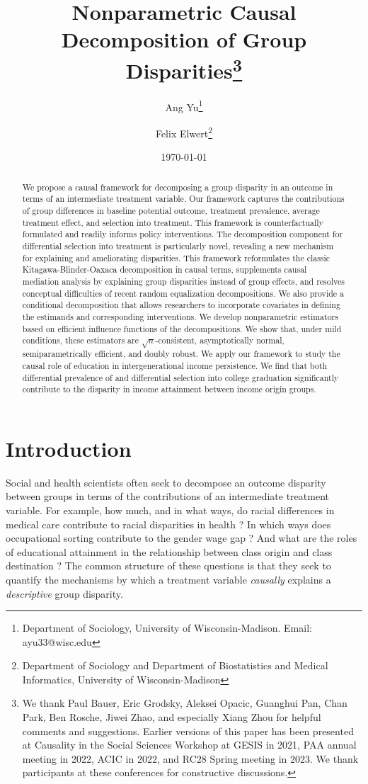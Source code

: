 \documentclass[12pt,a4paper]{article}
\title{\Large Nonparametric Causal Decomposition of Group Disparities\thanks{We thank Paul Bauer, Eric Grodsky, Aleksei Opacic, Guanghui Pan, Chan Park, Ben Rosche, Jiwei Zhao, and especially Xiang Zhou for helpful comments and suggestions. Earlier versions of this paper has been presented at Causality in the Social Sciences Workshop at GESIS in 2021, PAA annual meeting in 2022, ACIC in 2022, and RC28 Spring meeting in 2023. We thank participants at these conferences for constructive discussions.}}
\author{\large Ang Yu\thanks{Department of Sociology, University of Wisconsin-Madison. Email: ayu33@wisc.edu} \and Felix Elwert\thanks{Department of Sociology and Department of Biostatistics and Medical Informatics, University of Wisconsin-Madison}}
\date{\large \today}
\begin{document}
\maketitle

\begin{abstract}
We propose a causal framework for decomposing a group disparity in an outcome in terms of an intermediate treatment variable. Our framework captures the contributions of group differences in baseline potential outcome, treatment prevalence, average treatment effect, and selection into treatment. This framework is counterfactually formulated and readily informs policy interventions. The decomposition component for differential selection into treatment is particularly novel, revealing a new mechanism for explaining and ameliorating disparities. This framework reformulates the classic Kitagawa-Blinder-Oaxaca decomposition in causal terms, supplements causal mediation analysis by explaining group disparities instead of group effects, and resolves conceptual difficulties of recent random equalization decompositions. We also provide a conditional decomposition that allows researchers to incorporate covariates in defining the estimands and corresponding interventions. We develop nonparametric estimators based on efficient influence functions of the decompositions. We show that, under mild conditions, these estimators are $\sqrt{n}$-consistent, asymptotically normal, semiparametrically efficient, and doubly robust. We apply our framework to study the causal role of education in intergenerational income persistence. We find that both differential prevalence of and differential selection into college graduation significantly contribute to the disparity in income attainment between income origin groups.
\end{abstract}

\section{Introduction}
Social and health scientists often seek to decompose an outcome disparity between groups in terms of the contributions of an intermediate treatment variable. 
For example, how much, and in what ways, do racial differences in medical care contribute to racial disparities in health \citep{bosworth_racial_2006,howe_african_2014}? In which ways does occupational sorting contribute to the gender wage gap \citep{petersen_separate_1995,blau_gender_2017}? And what are the roles of educational attainment in the relationship between class origin and class destination \citep{ishida_class_1995, breen_educational_2010}? 
The common structure of these questions is that they seek to quantify the mechanisms by which a treatment variable \emph{causally} explains a \emph{descriptive} group disparity. 
\end{document}
